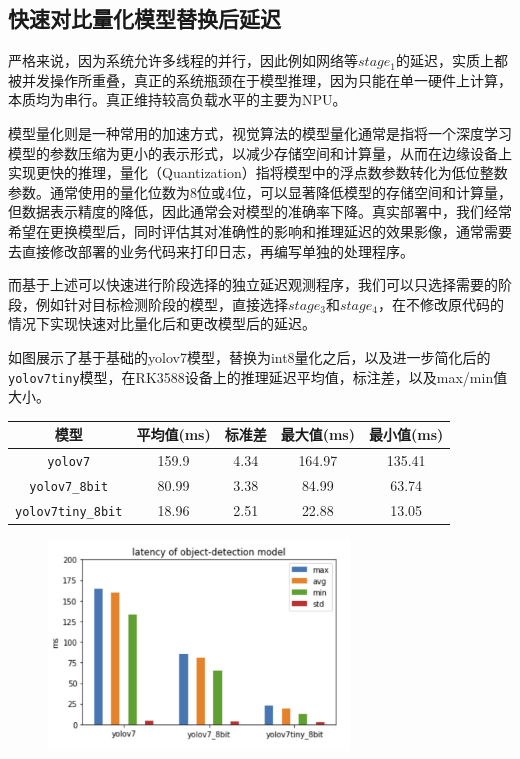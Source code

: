 \documentclass[master]{shtthesis}
\begin{document}
\subsection{快速对比量化模型替换后延迟}
严格来说，因为系统允许多线程的并行，因此例如网络等$stage_1$的延迟，实质上都被并发操作所重叠，真正的系统瓶颈在于模型推理，因为只能在单一硬件上计算，本质均为串行。真正维持较高负载水平的主要为NPU。

模型量化则是一种常用的加速方式，视觉算法的模型量化通常是指将一个深度学习模型的参数压缩为更小的表示形式，以减少存储空间和计算量，从而在边缘设备上实现更快的推理，量化（Quantization）指将模型中的浮点数参数转化为低位整数参数。通常使用的量化位数为8位或4位，可以显著降低模型的存储空间和计算量，但数据表示精度的降低，因此通常会对模型的准确率下降。真实部署中，我们经常希望在更换模型后，同时评估其对准确性的影响和推理延迟的效果影像，通常需要去直接修改部署的业务代码来打印日志，再编写单独的处理程序。

而基于上述可以快速进行阶段选择的独立延迟观测程序，我们可以只选择需要的阶段，例如针对目标检测阶段的模型，直接选择$stage_3$和$stage_4$，在不修改原代码的情况下实现快速对比量化后和更改模型后的延迟。

如图展示了基于基础的yolov7模型，替换为int8量化之后，以及进一步简化后的\verb*|yolov7tiny|模型，在RK3588设备上的推理延迟平均值，标注差，以及max/min值大小。

\begin{table}[htbp]
	\centering
	\begin{tabular}{ccccc}
		\toprule
		模型  & 平均值(ms) & 标准差 & 最大值(ms) & 最小值(ms)\\
		\midrule
		\verb*|yolov7|          & 159.9 & 4.34 & 164.97 & 135.41  \\ 
		\verb*|yolov7_8bit|     & 80.99 & 3.38 & 84.99  & 63.74 \\ 
		\verb*|yolov7tiny_8bit| & 18.96  & 2.51 & 22.88 & 13.05\\ 
		\bottomrule
	\end{tabular}
\end{table}

\begin{figure}[htbp]
	\centering
	\includegraphics[width=8cm]{img/model.png}
	\label{对比模型推理延迟}
\end{figure}
\end{document}
